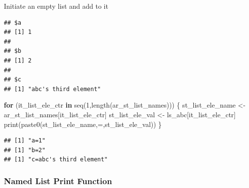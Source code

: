 \documentclass[
]{book}
\newenvironment{Shaded}{\begin{snugshade}}{\end{snugshade}}
\newcommand{\AttributeTok}[1]{\textcolor[rgb]{0.77,0.63,0.00}{#1}}
\newcommand{\CommentTok}[1]{\textcolor[rgb]{0.56,0.35,0.01}{\textit{#1}}}
\newcommand{\ControlFlowTok}[1]{\textcolor[rgb]{0.13,0.29,0.53}{\textbf{#1}}}
\newcommand{\DecValTok}[1]{\textcolor[rgb]{0.00,0.00,0.81}{#1}}
\newcommand{\FunctionTok}[1]{\textcolor[rgb]{0.00,0.00,0.00}{#1}}
\newcommand{\NormalTok}[1]{#1}
\newcommand{\OtherTok}[1]{\textcolor[rgb]{0.56,0.35,0.01}{#1}}
\newcommand{\SpecialCharTok}[1]{\textcolor[rgb]{0.00,0.00,0.00}{#1}}
\newcommand{\StringTok}[1]{\textcolor[rgb]{0.31,0.60,0.02}{#1}}
\begin{document}
Initiate an empty list and add to it

\begin{Shaded}
\end{Shaded}

\begin{verbatim}
## $a
## [1] 1
## 
## $b
## [1] 2
## 
## $c
## [1] "abc's third element"
\end{verbatim}

\begin{Shaded}
\begin{Highlighting}[]
\ControlFlowTok{for}\NormalTok{ (it\_list\_ele\_ctr }\ControlFlowTok{in} \FunctionTok{seq}\NormalTok{(}\DecValTok{1}\NormalTok{,}\FunctionTok{length}\NormalTok{(ar\_st\_list\_names))) \{}
\NormalTok{  st\_list\_ele\_name }\OtherTok{\textless{}{-}}\NormalTok{ ar\_st\_list\_names[it\_list\_ele\_ctr]}
\NormalTok{  st\_list\_ele\_val }\OtherTok{\textless{}{-}}\NormalTok{ ls\_abc[it\_list\_ele\_ctr]}
  \FunctionTok{print}\NormalTok{(}\FunctionTok{paste0}\NormalTok{(st\_list\_ele\_name,}\StringTok{\textquotesingle{}=\textquotesingle{}}\NormalTok{,st\_list\_ele\_val))}
\NormalTok{\}}
\end{Highlighting}
\end{Shaded}

\begin{verbatim}
## [1] "a=1"
## [1] "b=2"
## [1] "c=abc's third element"
\end{verbatim}

\hypertarget{named-list-print-function}{%
\subsubsection{Named List Print Function}\label{named-list-print-function}}
\end{document}
